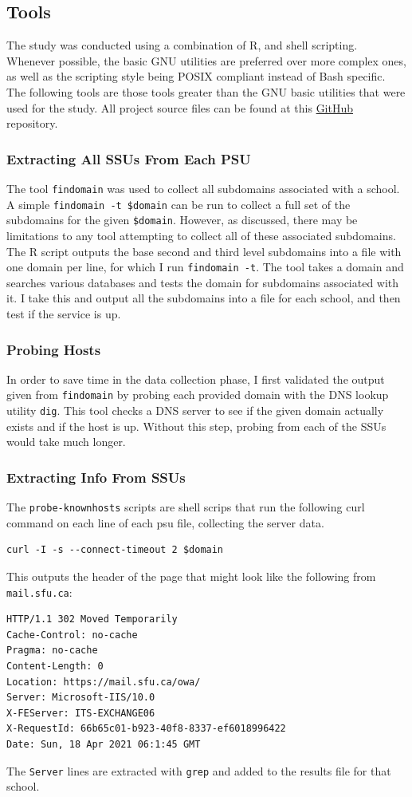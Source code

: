 \documentclass{article}
\theoremstyle{definition}
\begin{document}
\subsection{Tools} \label{sec:tools}
The study was conducted using a combination of R, and shell scripting.
Whenever possible, the basic GNU utilities are preferred over more complex
ones, as well as the scripting style being POSIX compliant instead of Bash
specific. The following tools are those tools greater than the GNU basic utilities
that were used for the study.
All project source files can be found at this
\href{https://github.com/chrissobczak/os-survey}{GitHub} repository.

\subsubsection{Extracting All SSUs From Each PSU}
The tool \texttt{findomain} was used to collect all subdomains associated with a school.
A simple \texttt{findomain -t \$domain} can be run to collect a full set of the subdomains
for the given \texttt{\$domain}. However, as discussed, there may be limitations to any tool
attempting to collect all of these associated subdomains.
The R script outputs the base second and third level subdomains
into a file with one domain per line, for which I run \texttt{findomain -t}.
The tool takes a domain and searches various databases and tests the domain
for subdomains associated with it. I take this and output all the subdomains
into a file for each school, and then test if the service is up.

\subsubsection{Probing Hosts}
In order to save time in the data collection phase, I first validated the output
given from \texttt{findomain} by probing each provided domain with the
DNS lookup utility \texttt{dig}. This tool checks a DNS server to see if the
given domain actually exists and if the host is up. Without this step,
probing from each of the SSUs would take much longer.

\subsubsection{Extracting Info From SSUs}
The \texttt{probe-knownhosts} scripts are shell scrips
that run the following curl command on each line of each
psu file, collecting the server data.
\begin{lstlisting}
curl -I -s --connect-timeout 2 $domain
\end{lstlisting}
This outputs the header of the page that might look like the following from \texttt{mail.sfu.ca}:
\begin{lstlisting}
HTTP/1.1 302 Moved Temporarily
Cache-Control: no-cache
Pragma: no-cache
Content-Length: 0
Location: https://mail.sfu.ca/owa/
Server: Microsoft-IIS/10.0
X-FEServer: ITS-EXCHANGE06
X-RequestId: 66b65c01-b923-40f8-8337-ef6018996422
Date: Sun, 18 Apr 2021 06:1:45 GMT
\end{lstlisting}
The \texttt{Server} lines are extracted with \texttt{grep} and added to the results file for that school.
\end{document}
